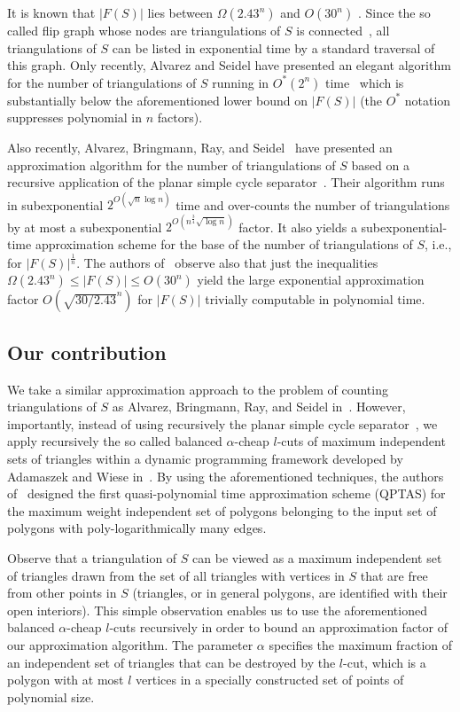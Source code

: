 \documentclass[a4paper]{article}
\begin{document}
It is known that $|F(S)|$ lies between $\Omega (2.43^n)$ \cite{SSW11}
and $O(30^n)$ \cite{SS11}. Since the so called flip graph
whose nodes are triangulations of
$S$ is connected~\cite{S78}, all triangulations of
$S$ can be listed in exponential time by a standard
traversal of this graph. 
Only recently, Alvarez and Seidel have presented an elegant
algorithm for the number of triangulations of
$S$ running in $O^*(2^n)$ time~\cite{AS13}
which is substantially below the aforementioned
lower bound on $|F(S)|$ (the $O^*$ notation suppresses polynomial
in $n$ factors).

Also recently, Alvarez, Bringmann, Ray, and Seidel~\cite{ABRS13}
have presented
an approximation algorithm for the number
of triangulations of $S$ based on a recursive
application of the planar simple cycle separator~\cite{M86}.
Their algorithm runs in subexponential $2^{O(\sqrt n\log n)}$ time
and over-counts the number of
triangulations by at most a subexponential 
$2^{O(n^{\frac 34}\sqrt{\log n})}$ factor.
It also yields a subexponential-time 
approximation scheme for the base
of the number of triangulations
of $S$, i.e., for $|F(S)|^{\frac 1n}$.
The authors of~\cite{ABRS13} observe also that
just the inequalities $\Omega (2.43^n)\le |F(S)|\le O(30^n)$   
yield the large exponential approximation 
factor $O(\sqrt {30/2.43}^n)$ 
for $|F(S)|$ trivially computable
in polynomial time.

\subsection{Our contribution}

We take a similar approximation approach to the
problem of counting triangulations of $S$
as Alvarez, Bringmann, Ray, and Seidel in~\cite{ABRS13}. However, importantly,
instead of using recursively the planar simple cycle separator~\cite{M86}, 
we apply recursively the so called
balanced $\alpha$-cheap $l$-cuts 
of maximum independent sets of triangles within
a dynamic programming framework developed
by Adamaszek and Wiese in~\cite{AW14,AW13}. 
By using the aforementioned techniques,
the authors of~\cite{AW14} designed 
the first quasi-polynomial time approximation
scheme (QPTAS) for the maximum weight independent set of
polygons belonging to the input set
of polygons with poly-logarithmically
many edges.

Observe that a triangulation of $S$ can
be viewed as a maximum independent set
of triangles drawn from the set of
all triangles with vertices in $S$ 
that are free from other points in $S$
(triangles, or in general polygons, are 
identified with their open interiors).
This simple observation enables us
to use the aforementioned
balanced $\alpha$-cheap $l$-cuts 
recursively in order to bound
an approximation factor of our approximation
algorithm. 
The parameter $\alpha$
specifies the maximum fraction of an
independent set of triangles that can be
destroyed by the $l$-cut, which is a polygon 
with at most $l$ vertices in a specially constructed
set of points of polynomial size.
\end{document}
